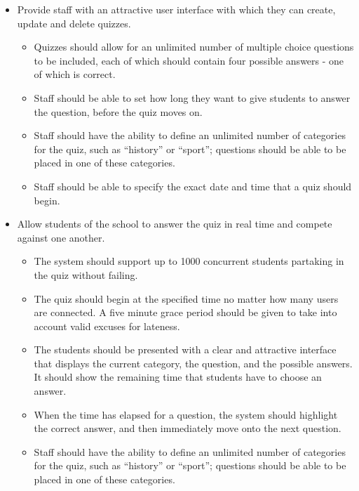 \begin{itemize}
	\item Provide staff with an attractive user interface with which they can create, update and delete quizzes.

		\begin{itemize}
			\item Quizzes should allow for an unlimited number of multiple choice questions to be included, each of which should contain four possible answers - one of which is correct.

			\item Staff should be able to set how long they want to give students to answer the question, before the quiz moves on.

			\item Staff should have the ability to define an unlimited number of categories for the quiz, such as ``history'' or ``sport''; questions should be able to be placed in one of these categories.

			\item Staff should be able to specify the exact date and time that a quiz should begin.
		\end{itemize}

	\item Allow students of the school to answer the quiz in real time and compete against one another.

		\begin{itemize}
			\item The system should support up to 1000 concurrent students partaking in the quiz without failing.

			\item The quiz should begin at the specified time no matter how many users are connected. A five minute grace period should be given to take into account valid excuses for lateness.

			\item The students should be presented with a clear and attractive interface that displays the current category, the question, and the possible answers. It should show the remaining time that students have to choose an answer.

			\item When the time has elapsed for a question, the system should highlight the correct answer, and then immediately move onto the next question.

			\item Staff should have the ability to define an unlimited number of categories for the quiz, such as ``history'' or ``sport''; questions should be able to be placed in one of these categories.


\end{itemize}
\end{itemize}

